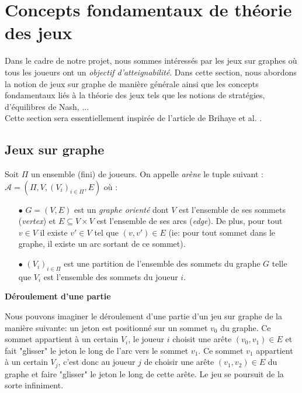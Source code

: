 
\section{Concepts fondamentaux de théorie des jeux}
Dans le cadre de notre projet, nous sommes intéressés par les jeux sur graphes où tous les joueurs ont un \textit{objectif d'atteignabilité}.
Dans cette section, nous abordons la notion de jeux sur graphe de manière générale ainsi que les concepts fondamentaux liés à la théorie des jeux tels que les notions de stratégies, d'équilibres de Nash, ...\\
Cette section sera essentiellement inspirée de l'article de Brihaye et al. \cite{DBLP:conf/lfcs/BrihayePS13}.

\subsection{Jeux sur graphe}


\begin{defi}[Arène]
	Soit $\Pi$ un ensemble (fini) de joueurs. On appelle \textit{arène} le tuple suivant :\\
	 $\mathscr{A} = (\Pi,V , (V_{i})_{i\in{\Pi}}, E )$ où :
	\begin{enumerate}
		\item[$\bullet$] $G = (V,E)$ est un \textit{graphe orienté}  dont $V$ est l'ensemble de ses sommets (\textit{vertex}) et $E \subseteq V \times V$ est l'ensemble de ses arcs (\textit{edge}). De plus, pour tout $ v\in V $ il existe $v'\in V$ tel que $(v,v') \in E$ (ie: pour tout sommet dans le graphe, il existe un arc sortant de ce sommet).
		\item[$\bullet$] $(V_{i})_{i\in\Pi}$ est une partition de l'ensemble des sommets du graphe $G$ telle que $V_{i}$ est l'ensemble des sommets du joueur $i$.
	\end{enumerate}
\end{defi}



\noindent\textbf{Déroulement d'une partie}

Nous pouvons imaginer le déroulement d'une partie d'un jeu sur graphe de la manière suivante: un jeton est positionné sur un sommet $v_{0}$ du graphe. Ce sommet appartient à un certain $V_{i}$, le joueur $i$ choisit une arête $(v_{0},v_{1}) \in E$ et fait "glisser" le jeton le long de l'arc vers le sommet $v_{1}$. Ce sommet $v_{1}$ appartient à un certain $V_{j}$, c'est donc au joueur $j$ de choisir une arête $(v_{1},v_{2})\in E$ du graphe et faire "glisser" le jeton le long de cette arête. Le jeu se poursuit de la sorte infiniment. \\


